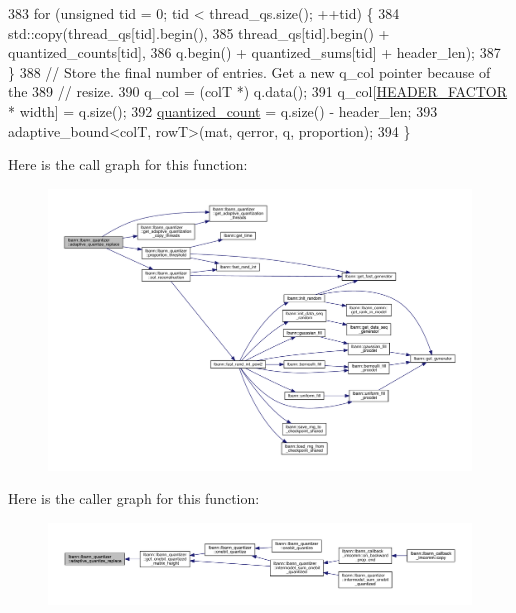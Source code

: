 \begin{DoxyCode}
383   \textcolor{keywordflow}{for} (\textcolor{keywordtype}{unsigned} tid = 0; tid < thread\_qs.size(); ++tid) \{
384     std::copy(thread\_qs[tid].begin(),
385               thread\_qs[tid].begin() + quantized\_counts[tid],
386               q.begin() + quantized\_sums[tid] + header\_len);
387   \}
388   \textcolor{comment}{// Store the final number of entries. Get a new q\_col pointer because of the}
389   \textcolor{comment}{// resize.}
390   q\_col = (colT *) q.data();
391   q\_col[\hyperlink{classlbann_1_1lbann__quantizer_afb4315625e371169cabfac56c3f75d37}{HEADER\_FACTOR} * width] = q.size();
392   \hyperlink{classlbann_1_1lbann__quantizer_a716fae78ef5ba082a8093f0d06550804}{quantized\_count} = q.size() - header\_len;
393   adaptive\_bound<colT, rowT>(mat, qerror, q, proportion);
394 \}
\end{DoxyCode}
Here is the call graph for this function\+:\nopagebreak
\begin{figure}[H]
\begin{center}
\leavevmode
\includegraphics[width=350pt]{classlbann_1_1lbann__quantizer_a25ed3869c6bc615ae51198803ea4e33d_cgraph}
\end{center}
\end{figure}
Here is the caller graph for this function\+:\nopagebreak
\begin{figure}[H]
\begin{center}
\leavevmode
\includegraphics[width=350pt]{classlbann_1_1lbann__quantizer_a25ed3869c6bc615ae51198803ea4e33d_icgraph}
\end{center}
\end{figure}
\mbox{\label{classlbann_1_1lbann__quantizer_ab3a0e79b571e7c016446c179eedd0dc1}} 
